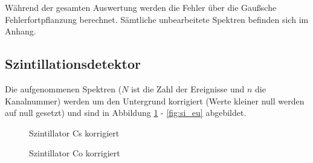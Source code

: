 Während der gesamten Auswertung werden die Fehler über die Gaußsche Fehlerfortpflanzung berechnet. Sämtliche unbearbeitete Spektren befinden sich im Anhang. 

\subsection{Szintillationsdetektor}
Die aufgenommenen Spektren ($N$ ist die Zahl der Ereignisse und $n$ die Kanalnummer) werden um den Untergrund korrigiert (Werte kleiner null werden auf null gesetzt) und sind in Abbildung \ref{fig:si_cs} - \ref{fig:si_eu} abgebildet. 

\begin{figure}[h]
\centering
{}
\caption{Szintillator Cs korrigiert}
\label{fig:si_cs}
\end{figure}

\newpage

\begin{figure}[h]
\centering
{}
\caption{Szintillator Co korrigiert}
\label{fig:si_co}
\end{figure}

